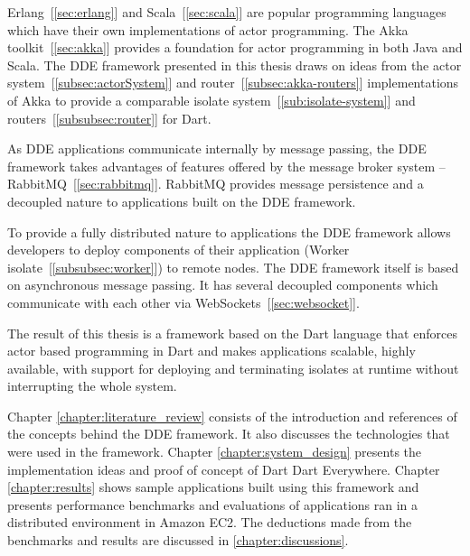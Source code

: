   Erlang~[\autoref{sec:erlang}] and Scala~[\autoref{sec:scala}] are popular programming languages which have their own implementations of actor programming. The Akka toolkit~[\autoref{sec:akka}] provides a foundation for actor programming in both Java and Scala. The \acrshort{DDE} framework presented in this thesis draws on ideas from the actor system~[\autoref{subsec:actorSystem}] and router~[\autoref{subsec:akka-routers}]
   implementations of Akka to provide a comparable isolate system~[\autoref{sub:isolate-system}] and routers~[\autoref{subsubsec:router}] for Dart.

  As \acrshort{DDE} applications communicate internally by message passing, the \acrshort{DDE} framework takes advantages of features offered by the message broker system – RabbitMQ~[\autoref{sec:rabbitmq}]. RabbitMQ provides message persistence and a decoupled nature to applications built on the \acrshort{DDE} framework.

  To provide a fully distributed nature to applications the \acrshort{DDE} framework allows developers to deploy components of their application (Worker isolate~[\autoref{subsubsec:worker}]) to remote nodes. The \acrshort{DDE} framework itself is based on asynchronous message passing. It has several decoupled components which communicate with each other via WebSockets~[\autoref{sec:websocket}].

  The result of this thesis is a framework based on the Dart language that enforces actor based programming in Dart and makes applications scalable, highly available, with support for deploying and terminating isolates at runtime without interrupting the whole system.

 Chapter \ref{chapter:literature_review} consists of the introduction and references of the concepts behind the \acrshort{DDE} framework. It also discusses the technologies that were used in the framework. Chapter \ref{chapter:system_design} presents the implementation ideas and proof of concept of Dart Dart Everywhere. Chapter \ref{chapter:results} shows sample applications built using this framework and presents performance benchmarks and evaluations of applications ran in a distributed environment in Amazon EC2. The deductions made from the benchmarks and results are discussed in \autoref{chapter:discussions}.
